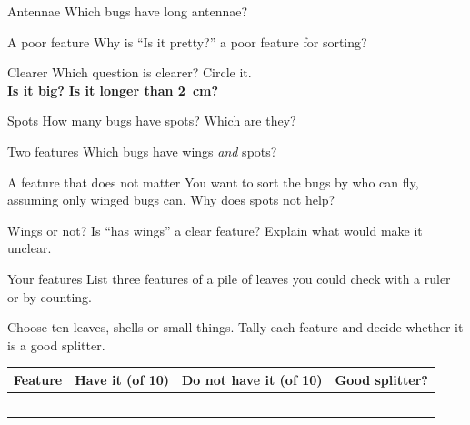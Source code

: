 \begin{puzzle}{Antennae}
Which bugs have long antennae? \wline[4cm]
\end{puzzle}

\begin{puzzle}{A poor feature}
Why is ``Is it pretty?'' a poor feature for sorting? \wline[6cm]
\end{puzzle}

\begin{puzzle}{Clearer}
Which question is clearer? Circle it.\\
\textbf{Is it big?} \qquad \textbf{Is it longer than 2~cm?}
\end{puzzle}

\clearpage

\begin{puzzle}{Spots}
How many bugs have spots? \wline[1.6cm] Which are they? \wline[3cm]
\end{puzzle}

\begin{puzzle}{Two features}
Which bugs have wings \emph{and} spots? \wline[4cm]
\end{puzzle}

\begin{puzzle}{A feature that does not matter}
You want to sort the bugs by who can fly, assuming only winged bugs can. Why does spots not help? \wline[6cm]
\end{puzzle}

\begin{puzzle}{Wings or not?}
Is ``has wings'' a clear feature? Explain what would make it unclear. \wline[6cm]
\end{puzzle}

\begin{puzzle}{Your features}
List three features of a pile of leaves you could check with a ruler or by counting. \wline[7cm]
\end{puzzle}
\clearpage

\thispagestyle{fancy}
Choose ten leaves, shells or small things. Tally each feature and decide whether it is a good splitter.\par\medskip
\renewcommand{\arraystretch}{3.0}
\begin{tabularx}{\linewidth}{|>{\sffamily\small\bfseries}p{3.0cm}|X|X|X|}
\hline
Feature & Have it (of 10) & Do not have it (of 10) & Good splitter? \\ \hline
 & & & \\ \hline
 & & & \\ \hline
 & & & \\ \hline
 & & & \\ \hline
 & & & \\ \hline
\end{tabularx}

